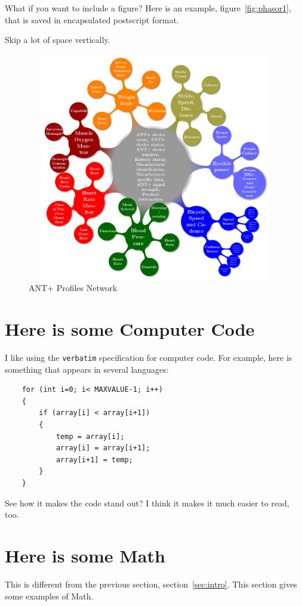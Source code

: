 \documentclass[conference]{IEEEconf}
\begin{document}
What if you want to include a figure? 
Here is an example, figure~\ref{fig:phasor1}, that is saved in 
encapsulated postscript format.




Skip a lot of space  \bigskip  vertically.
\begin{figure}[ht]
\centering\includegraphics[width=12cm, height=10cm]{AntPlusProfiles}
\caption{\label{AntPlus}ANT+ Profiles Network}

\end{figure}
\section{Here is some Computer Code}\label{sec:code}

I like using the \verb"verbatim" specification for computer code. 
For example, here is something that appears in several
languages:

\begin{verbatim}
    for (int i=0; i< MAXVALUE-1; i++)
    {
        if (array[i] < array[i+1]) 
        {
            temp = array[i];
            array[i] = array[i+1];
            array[i+1] = temp;
        }
    }
\end{verbatim}

See how it makes the code stand out? I think it makes it
much easier to read, too.

\section{Here is some Math}\label{sec:math}
This is different from the previous section, section~\ref{sec:intro}.
This section gives some examples of Math.
\end{document}
